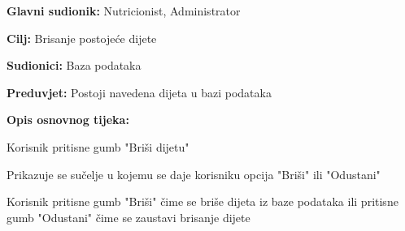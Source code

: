                     \noindent {}
                    \begin{packed_item}
    
                        \item \textbf{Glavni sudionik: }Nutricionist, Administrator
                        \item  \textbf{Cilj:} Brisanje postojeće dijete
                        \item  \textbf{Sudionici:} Baza podataka
                        \item  \textbf{Preduvjet:} Postoji navedena dijeta u bazi podataka
                        \item  \textbf{Opis osnovnog tijeka:} 
                        
                        \item[] \begin{packed_enum}
    
                            \item Korisnik pritisne gumb "Briši dijetu"
                            \item Prikazuje se sučelje u kojemu se daje korisniku opcija "Briši" ili "Odustani"
                            \item Korisnik pritisne gumb "Briši" čime se briše dijeta iz baze podataka ili pritisne gumb "Odustani" čime se zaustavi brisanje dijete
                        \end{packed_enum}
                        
                    \end{packed_item}

